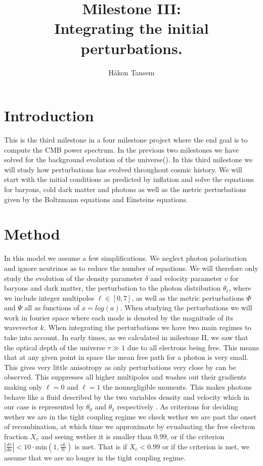 \documentclass[onecolumn]{aastex62}
\begin{document}
\title{\Large Milestone III:\\Integrating the initial perturbations.}


\author{Håkon Tansem}

\section{Introduction} \label{sec:intro}
This is the third milestone in a four milestone project where the end goal is to compute the CMB power spectrum. In the previous two milestones we have solved for the background evolution of the universe(). In this third milestone we will study how perturbations has evolved throughout cosmic history. We will start with the initial conditions as predicted by inflation and solve the equations for baryons, cold dark matter and photons as well as the metric perturbations given by the Boltzmann equations and Einsteins equations.
\section{Method} \label{sec:method}
In this model we assume a few simplifications. We neglect photon polarization and ignore neutrinos as to reduce the number of equations. We will therefore only study the evolution of the density parameter $\delta$ and velocity parameter $v$ for baryons and dark matter, the perturbation to the photon distribution $\theta_{\ell}$, where we include integer multipoles $\ell\in[0, 7]$, as well as the metric perturbations $\Phi$ and $\Psi$ all as functions of $x=log(a)$. When studying the perturbations we will work in fourier space where each mode is denoted by the magnitude of its wavevector $k$. When integrating the perturbations we have two main regimes to take into account. In early times, as we calculated in milestone II, we saw that the optical depth of the universe $\tau\gg1$ due to all electrons being free. This means that at any given point in space the mean free path for a photon is very small. This gives very little anisotropy as only perturbations very close by can be observed. This suppresses all higher multipoles and washes out their gradients making only $\ell=0$ and $\ell=1$ the nonnegligible moments. This makes photons behave like a fluid described by the two variables density and velocity which in our case is represented by $\theta_0$ and $\theta_1$ respectively \citep[p. 225]{Dodelson:1282338}. As criterions for deciding wether we are in the tight coupling regime we check wether we are past the onset of recombination, at which time we approximate by evualuating the free electron fraction $X_e$ and seeing wether it is smaller than $0.99$, or if the criterion $\left|\frac{d\tau}{dx}\right| < 10 \cdot \text{min}(1, \frac{ck}{\mathcal{H}})$ is met. That is if $X_e < 0.99$ or if the criterion is met, we assume that we are no longer in the tight coupling regime.\\\indent
\end{document}
